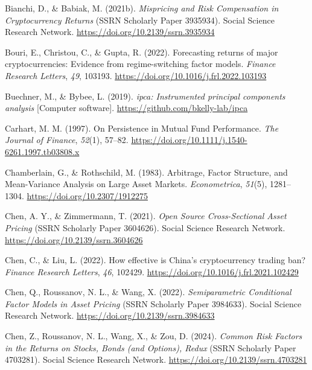 \documentclass[
  12pt,
  a4paper,
  openany]{scrbook}
\newlength{\cslhangindent}
\newenvironment{CSLReferences}[2] %
 {\begin{list}{}{%
  \setlength{\itemindent}{0pt}
  \setlength{\leftmargin}{0pt}
  \setlength{\parsep}{0pt}
  \ifodd #1
   \setlength{\leftmargin}{\cslhangindent}
   \setlength{\itemindent}{-1\cslhangindent}
  \fi
  \setlength{\itemsep}{#2\baselineskip}}}
 {\end{list}}
\begin{document}
\begin{CSLReferences}{1}{0}
Bianchi, D., \& Babiak, M. (2021b). \emph{Mispricing and Risk
Compensation in Cryptocurrency Returns} (SSRN Scholarly Paper 3935934).
Social Science Research Network.
\url{https://doi.org/10.2139/ssrn.3935934}

Bouri, E., Christou, C., \& Gupta, R. (2022). Forecasting returns of
major cryptocurrencies: Evidence from regime-switching factor models.
\emph{Finance Research Letters}, \emph{49}, 103193.
\url{https://doi.org/10.1016/j.frl.2022.103193}

Buechner, M., \& Bybee, L. (2019). \emph{{ipca}: Instrumented principal
components analysis} {[}Computer software{]}.
\url{https://github.com/bkelly-lab/ipca}

Carhart, M. M. (1997). On Persistence in Mutual Fund Performance.
\emph{The Journal of Finance}, \emph{52}(1), 57--82.
\url{https://doi.org/10.1111/j.1540-6261.1997.tb03808.x}

Chamberlain, G., \& Rothschild, M. (1983). Arbitrage, Factor Structure,
and Mean-Variance Analysis on Large Asset Markets. \emph{Econometrica},
\emph{51}(5), 1281--1304. \url{https://doi.org/10.2307/1912275}

Chen, A. Y., \& Zimmermann, T. (2021). \emph{Open Source Cross-Sectional
Asset Pricing} (SSRN Scholarly Paper 3604626). Social Science Research
Network. \url{https://doi.org/10.2139/ssrn.3604626}

Chen, C., \& Liu, L. (2022). How effective is China's cryptocurrency
trading ban? \emph{Finance Research Letters}, \emph{46}, 102429.
\url{https://doi.org/10.1016/j.frl.2021.102429}

Chen, Q., Roussanov, N. L., \& Wang, X. (2022). \emph{Semiparametric
Conditional Factor Models in Asset Pricing} (SSRN Scholarly Paper
3984633). Social Science Research Network.
\url{https://doi.org/10.2139/ssrn.3984633}

Chen, Z., Roussanov, N. L., Wang, X., \& Zou, D. (2024). \emph{Common
Risk Factors in the Returns on Stocks, Bonds (and Options), Redux} (SSRN
Scholarly Paper 4703281). Social Science Research Network.
\url{https://doi.org/10.2139/ssrn.4703281}


\end{CSLReferences}
\end{document}
